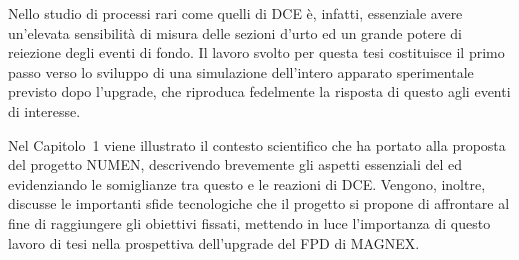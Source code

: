 Nello studio di processi rari come quelli di DCE è, infatti, essenziale avere un'elevata sensibilità di misura delle sezioni d'urto ed un grande potere di reiezione degli eventi di fondo. 
Il lavoro svolto per questa tesi costituisce il primo passo verso lo sviluppo di una simulazione dell'intero apparato sperimentale previsto dopo l'upgrade, che riproduca fedelmente la risposta di questo agli eventi di interesse.
 


Nel Capitolo~1 viene illustrato il contesto scientifico che ha portato alla proposta del progetto NUMEN, descrivendo brevemente gli aspetti essenziali del \doppiobeta{} ed evidenziando le somiglianze tra questo e le reazioni di DCE.
Vengono, inoltre, discusse le importanti sfide tecnologiche che il progetto si propone di affrontare al fine di raggiungere gli obiettivi fissati, mettendo in luce l'importanza di questo lavoro di tesi nella prospettiva dell'upgrade del FPD di MAGNEX.


